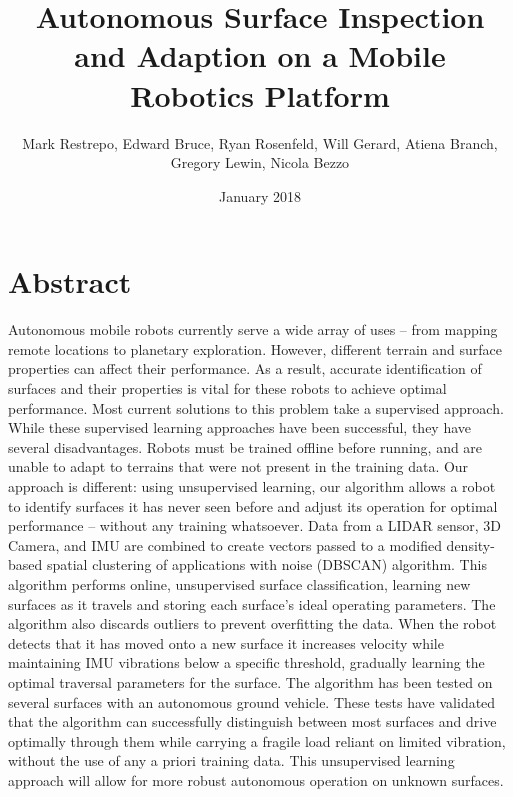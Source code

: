 \documentclass{article}
\title{Autonomous Surface Inspection and Adaption on a Mobile Robotics Platform}
\author{Mark Restrepo, Edward Bruce, Ryan Rosenfeld, Will Gerard, Atiena Branch, Gregory Lewin, Nicola Bezzo}
\date{January 2018}
\begin{document}
\section{Abstract}



Autonomous mobile robots  currently serve a wide array of uses -- from mapping remote locations to planetary exploration. However, different terrain and surface properties can affect their performance. As a result, accurate identification of surfaces and their properties is vital for these robots to achieve optimal performance. Most current solutions to this problem take a supervised approach. While these supervised learning approaches have been successful, they have several disadvantages. Robots must be trained offline before running, and are unable to adapt to terrains that were not present in the training data. Our approach is different: using unsupervised learning, our algorithm allows a robot to identify surfaces it has never seen before and adjust its operation for optimal performance -- without any training whatsoever. Data from a LIDAR sensor, 3D Camera, and IMU are combined to create vectors passed to a modified density-based spatial clustering of applications with noise (DBSCAN) algorithm. This algorithm performs online, unsupervised surface classification, learning new surfaces as it travels and storing each surface's ideal operating parameters. The algorithm also discards outliers to prevent overfitting the data. When the robot detects that it has moved onto a new surface it increases velocity while maintaining IMU vibrations below a specific threshold, gradually learning the optimal traversal parameters for the surface. The algorithm has been tested on several surfaces with an autonomous ground vehicle. These tests have validated that the algorithm can successfully distinguish between most surfaces and drive optimally through them while carrying a fragile load reliant on limited vibration, without the use of any a priori training data. This unsupervised learning approach will allow for more robust autonomous operation on unknown surfaces. 
\end{document}

